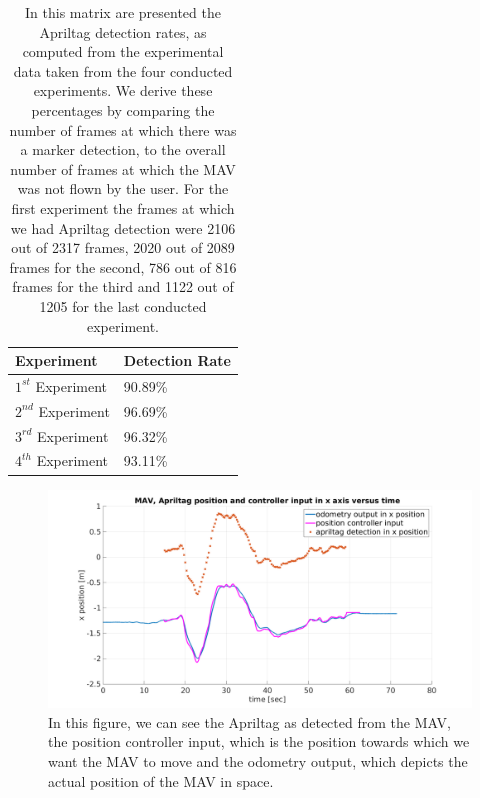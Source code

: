 \begin{table}
\begin{center}
    \begin{tabular}{ | l | l |}
    \hline
    Experiment & Detection Rate \\ \hline
    $1^{st}$ Experiment & 90.89\% \\ \hline
    $2^{nd}$ Experiment & 96.69\% \\ \hline
    $3^{rd}$ Experiment & 96.32\% \\ \hline
    $4^{th}$ Experiment & 93.11\% \\ \hline
    \end{tabular}
    \caption{In this matrix are presented the Apriltag detection rates, as computed from the experimental data taken from the four conducted experiments. We derive these percentages by comparing the number of frames at which there was a marker detection, to the overall number of frames at which the MAV was not flown by the user. For the first experiment the frames at which we had Apriltag detection were 2106 out of 2317 frames, 2020 out of 2089 frames for the second, 786 out of 816 frames for the third and 1122 out of 1205 for the last conducted experiment.}
    \label{table:detctionRates}
\end{center}
\end{table}

\begin{figure}
	\centering
	 \includegraphics[width=1.00\textwidth]{images/real_MAV_odom_controller_bag3.pdf}
	 \caption{In this figure, we can see the Apriltag as detected from the MAV, the position controller input, which is the position towards which we want the MAV to move and the odometry output, which depicts the actual position of the MAV in space.}
	 \label{pics:realOdomControlDetection}
\end{figure}

